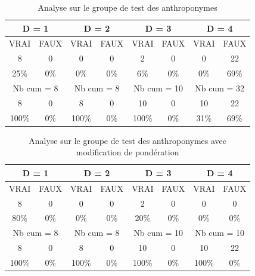 \renewcommand{\arraystretch} {1.25}
\begin{table}[ht]
    \centering
    \begin{tabular}{|c|c|c|c|c|c|c|c|}
        \hline \multicolumn{2}{|c}{D = 1}& \multicolumn{2}{|c}{D = 2} & \multicolumn{2}{|c}{D = 3} & \multicolumn{2}{|c|}{D = 4} \\
        \hline VRAI & FAUX & VRAI & FAUX & VRAI & FAUX & VRAI & FAUX \\
        \hline \hline  8 & 0 & 0 & 0 & 2 & 0 & 0 & 22 \\
        \hline 25\% & 0\% & 0\% & 0\% & 6\% & 0\% & 0\% & 69\%  \\
        \hline \hline \multicolumn{2}{|c}{Nb cum = 8 }& \multicolumn{2}{|c|}{Nb cum = 8 } & \multicolumn{2}{c|}{Nb cum = 10} & \multicolumn{2}{c|}{Nb cum = 32} \\
        \hline \hline  8 & 0 & 8 & 0 & 10 & 0 & 10 & 22 \\
        \hline 100\% & 0\% & 100\% & 0\% & 100\% & 0\% & 31\% & 69\%  \\
        \hline 
    \end{tabular}
    \caption{Analyse sur le groupe de test des anthroponymes }
    \label{groupe_anthro}
\end{table}

\renewcommand{\arraystretch} {1.25}
\begin{table}[ht]
    \centering
    \begin{tabular}{|c|c|c|c|c|c|c|c|}
        \hline \multicolumn{2}{|c}{D = 1}& \multicolumn{2}{|c}{D = 2} & \multicolumn{2}{|c}{D = 3} & \multicolumn{2}{|c|}{D = 4} \\
        \hline VRAI & FAUX & VRAI & FAUX & VRAI & FAUX & VRAI & FAUX \\
        \hline \hline  8 & 0 & 0 & 0 & 2 & 0 & 0 & 0 \\
        \hline 80\% & 0\% & 0\% & 0\% & 20\% & 0\% & 0\% & 0\%  \\
        \hline \hline \multicolumn{2}{|c}{Nb cum = 8}& \multicolumn{2}{|c|}{Nb cum = 8} & \multicolumn{2}{c|}{Nb cum = 10} & \multicolumn{2}{c|}{Nb cum = 10} \\
        \hline \hline  8 & 0 & 8 & 0 & 10 & 0 & 10 & 22 \\
        \hline 100\% & 0\% & 100\% & 0\% & 100\% & 0\% & 100\% & 0\%  \\
        \hline 
    \end{tabular}
    \begin{center}
        \caption{Analyse sur le groupe  de test des anthroponymes avec modification de pondération}
    \end{center}
    
    \label{groupe_anthro_md}
\end{table}

